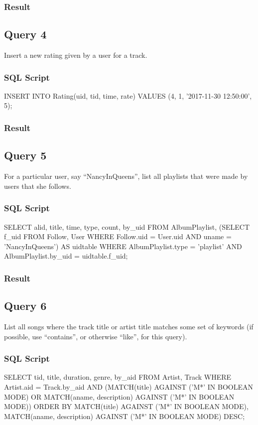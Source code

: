 \documentclass[letter, 12pt]{report}
\begin{document}
	\subsubsection{Result}
	
	\subsection{Query 4}
	Insert a new rating given by a user for a track.
	\subsubsection{SQL Script}
	\begin{spverbatim}
		INSERT INTO Rating(uid, tid, time, rate) VALUES (4, 1, '2017-11-30 12:50:00', 5);
	\end{spverbatim}
	\subsubsection{Result}
	
	\subsection{Query 5}
	For a particular user, say “NancyInQueens”, list all playlists that were made by users that she follows.
	\subsubsection{SQL Script}
	\begin{spverbatim}
		SELECT alid, title, time, type, count, by_uid FROM AlbumPlaylist,
		(SELECT f_uid FROM Follow, User
		WHERE Follow.uid = User.uid
		AND uname = 'NancyInQueens') AS uidtable
		WHERE AlbumPlaylist.type = 'playlist'
		AND AlbumPlaylist.by_uid = uidtable.f_uid;
	\end{spverbatim}
	\subsubsection{Result}
	
	\subsection{Query 6}
	List all songs where the track title or artist title matches some set of keywords (if possible, use
	``contains'', or otherwise ``like'', for this query).
	
	\subsubsection{SQL Script}
	\begin{spverbatim}
		SELECT tid, title, duration, genre, by_aid FROM Artist, Track 
		WHERE Artist.aid = Track.by_aid
		AND (MATCH(title)
		AGAINST ('M*' IN BOOLEAN MODE)
		OR MATCH(aname, description)
		AGAINST ('M*' IN BOOLEAN MODE))
		ORDER BY MATCH(title)
		AGAINST ('M*' IN BOOLEAN MODE),
		MATCH(aname, description)
		AGAINST ('M*' IN BOOLEAN MODE) DESC;
	\end{spverbatim}
\end{document}
